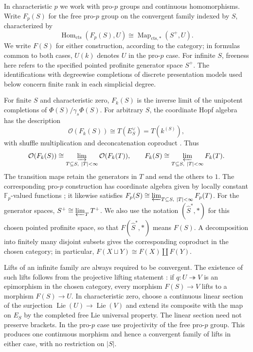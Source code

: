 \documentclass[11pt,a4paper]{article}
\begin{document}
In characteristic $p$ we work with pro-$p$ groups and continuous
homomorphisms.  Write $F_p(S)$ for the free pro-$p$ group on the
convergent family indexed by $S$, characterized by
\[
 \operatorname{Hom}_{\mathrm{cts}}(F_p(S),U)
 \cong\operatorname{Map}_{\mathrm{cts},*}(S^+,U).
\]
We write $F(S)$ for either construction, according to the category;
in formulas common to both cases, $U(k)$ denotes $U$ in the pro-$p$
case.  For infinite $S$, freeness here refers to the specified pointed
profinite generator space $S^+$.  The identifications with degreewise
completions of discrete presentation models used below concern finite
rank in each simplicial degree.

For finite $S$ and characteristic zero, $F_k(S)$ is the inverse limit
of the unipotent completions of $\Phi(S)/\gamma_s\Phi(S)$.
For arbitrary $S$, the coordinate Hopf algebra has the description
\[
 \mathcal O(F_k(S))\cong T(E_S^\vee)=T(k^{(S)}),
\]
with shuffle multiplication and deconcatenation coproduct
\cite[Example~4]{Mikh2023}.  Thus
\[
 \mathcal O(F_k(S))\cong
 \varinjlim_{T\subseteq S,\ |T|<\infty}\mathcal O(F_k(T)),
 \qquad
 F_k(S)\cong\varprojlim_{T\subseteq S,\ |T|<\infty}F_k(T).
\]
The transition maps retain the generators in $T$ and send the others
to $1$.  The corresponding pro-$p$ construction has coordinate algebra
given by locally constant $\mathbb F_p$-valued functions
\cite[Example~6]{Mikh2023}; it likewise satisfies
$F_p(S)\cong\varprojlim_{T\subseteq S,\ |T|<\infty}F_p(T)$.
For the generator spaces, $S^+\cong\varprojlim_T T^+$.
We also use the notation $(\widehat S^*,*)$ for this chosen pointed
profinite space, so that $F(\widehat S^*,*)$ means $F(S)$.
A decomposition into finitely many disjoint subsets gives the
corresponding coproduct in the chosen category; in particular,
$F(X\sqcup Y)\cong F(X)\amalg F(Y)$.

Lifts of an infinite family are always required to be convergent.
The existence of such lifts follows from the projective lifting
statement \cite[Proposition~2.3]{MikhContinuous}: if $q:U\twoheadrightarrow V$
is an epimorphism in the chosen category, every morphism $F(S)\to V$
lifts to a morphism $F(S)\to U$.  In characteristic zero, choose a
continuous linear section of the surjection
$\operatorname{Lie}(U)\to\operatorname{Lie}(V)$ and extend its composite
with the map on $E_S$ by the completed free Lie universal property.
The linear section need not preserve brackets.  In the pro-$p$ case
use projectivity of the free pro-$p$ group.  This produces one
continuous morphism and hence a convergent family of lifts in either
case, with no restriction on $|S|$.
\end{document}
